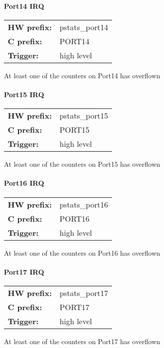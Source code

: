 \paragraph*{Port14 IRQ}\vspace{12pt}
\begin{small}
\begin{tabular}{l l }
{\bf HW prefix:}  & pstats\_port14\\
{\bf C prefix:}  & PORT14\\
{\bf Trigger:}  & high level\\
\end{tabular}

\end{small}
\vspace{12pt}
At least one of the counters on Port14 has overflown
\paragraph*{Port15 IRQ}\vspace{12pt}
\begin{small}
\begin{tabular}{l l }
{\bf HW prefix:}  & pstats\_port15\\
{\bf C prefix:}  & PORT15\\
{\bf Trigger:}  & high level\\
\end{tabular}

\end{small}
\vspace{12pt}
At least one of the counters on Port15 has overflown
\paragraph*{Port16 IRQ}\vspace{12pt}
\begin{small}
\begin{tabular}{l l }
{\bf HW prefix:}  & pstats\_port16\\
{\bf C prefix:}  & PORT16\\
{\bf Trigger:}  & high level\\
\end{tabular}

\end{small}
\vspace{12pt}
At least one of the counters on Port16 has overflown
\paragraph*{Port17 IRQ}\vspace{12pt}
\begin{small}
\begin{tabular}{l l }
{\bf HW prefix:}  & pstats\_port17\\
{\bf C prefix:}  & PORT17\\
{\bf Trigger:}  & high level\\
\end{tabular}

\end{small}
\vspace{12pt}
At least one of the counters on Port17 has overflown

